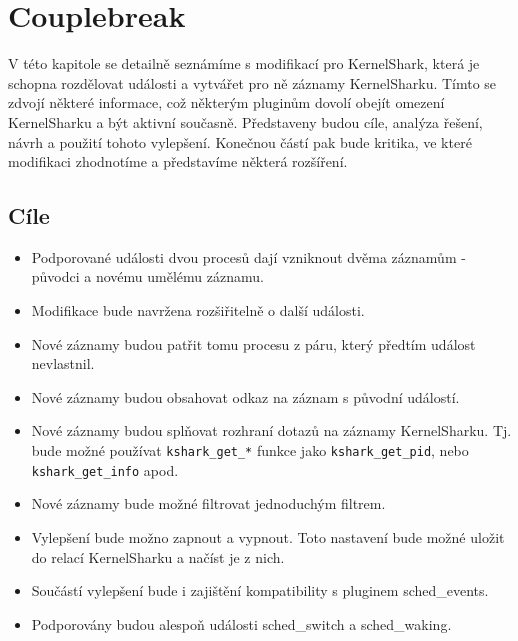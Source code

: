 \chapter{Couplebreak}
V této kapitole se detailně seznámíme s modifikací pro KernelShark, která je schopna rozdělovat události a vytvářet pro ně záznamy KernelSharku. Tímto se zdvojí některé informace, což některým pluginům dovolí obejít omezení KernelSharku a být aktivní současně. Představeny budou cíle, analýza řešení, návrh a použití tohoto vylepšení. Konečnou částí pak bude kritika, ve které modifikaci zhodnotíme a představíme některá rozšíření.

\section{Cíle}
\begin{itemize}
    \item Podporované události dvou procesů dají vzniknout dvěma záznamům - původci a novému umělému záznamu.
    \item Modifikace bude navržena rozšiřitelně o další události.
    \item Nové záznamy budou patřit tomu procesu z páru, který předtím událost nevlastnil.
    \item Nové záznamy budou obsahovat odkaz na záznam s původní událostí.
    \item Nové záznamy budou splňovat rozhraní dotazů na záznamy KernelSharku. Tj. bude možné používat \texttt{kshark\_get\_*} funkce jako \texttt{kshark\_get\_pid}, nebo \texttt{kshark\_get\_info} apod.
    \item Nové záznamy bude možné filtrovat jednoduchým filtrem.
    \item Vylepšení bude možno zapnout a vypnout. Toto nastavení bude možné uložit do relací KernelSharku a načíst je z nich.
    \item Součástí vylepšení bude i zajištění kompatibility s pluginem sched\_events.
    \item Podporovány budou alespoň události sched\_switch a sched\_waking.
\end{itemize}

